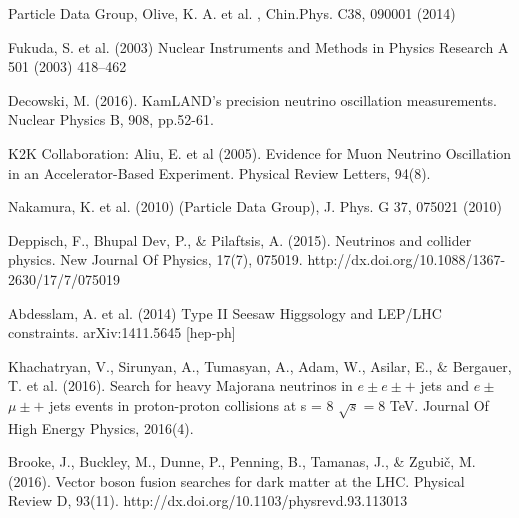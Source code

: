 \documentclass[11pt, oneside]{book}
\begin{document}
%
%
%



%


\begin{thebibliography}{10}

Particle Data Group, Olive, K. A. et al. , Chin.Phys. C38, 090001 (2014)


 Fukuda, S. et al. (2003) Nuclear Instruments and Methods in Physics Research A 501 (2003) 418–462

 Decowski, M. (2016). KamLAND's precision neutrino oscillation measurements. Nuclear Physics B, 908, pp.52-61.

 K2K Collaboration: Aliu, E. et al (2005). Evidence for Muon Neutrino Oscillation in an Accelerator-Based Experiment. Physical Review Letters, 94(8).

Nakamura, K. et al. (2010) (Particle Data Group), J. Phys. G 37, 075021 (2010) 

 Deppisch, F., Bhupal Dev, P., \& Pilaftsis, A. (2015). Neutrinos and collider physics. New Journal Of Physics, 17(7), 075019. http://dx.doi.org/10.1088/1367-2630/17/7/075019

 Abdesslam, A. et al. (2014) Type II Seesaw Higgsology and LEP/LHC constraints. arXiv:1411.5645 [hep-ph]

 Khachatryan, V., Sirunyan, A., Tumasyan, A., Adam, W., Asilar, E., \& Bergauer, T. et al. (2016). Search for heavy Majorana neutrinos in $e\pm e\pm +$ jets and $e\pm$ $\mu \pm +$ jets events in proton-proton collisions at s = 8 $\sqrt{s}=8$ TeV. Journal Of High Energy Physics, 2016(4).

 Brooke, J., Buckley, M., Dunne, P., Penning, B., Tamanas, J., \& Zgubič, M. (2016). Vector boson fusion searches for dark matter at the LHC. Physical Review D, 93(11). http://dx.doi.org/10.1103/physrevd.93.113013


\end{thebibliography}
\end{document}
